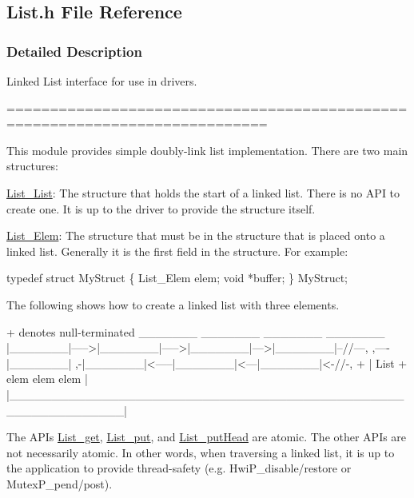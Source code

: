 \subsection{List.\+h File Reference}
\label{_list_8h}


\subsubsection{Detailed Description}
Linked List interface for use in drivers. 

============================================================================

This module provides simple doubly-\/link list implementation. There are two main structures\+:
\begin{DoxyItemize}
\item \hyperlink{struct_list___list}{List\+\_\+\+List}\+: The structure that holds the start of a linked list. There is no A\+P\+I to create one. It is up to the driver to provide the structure itself.
\item \hyperlink{struct_list___elem}{List\+\_\+\+Elem}\+: The structure that must be in the structure that is placed onto a linked list. Generally it is the first field in the structure. For example\+: 
\begin{DoxyCode}
\textcolor{keyword}{typedef} \textcolor{keyword}{struct }MyStruct \{
    List_Elem elem;
    \textcolor{keywordtype}{void} *buffer;
\} MyStruct;
\end{DoxyCode}

\end{DoxyItemize}

The following shows how to create a linked list with three elements.


\begin{DoxyCode}
+ denotes null-terminated
        \_\_\_\_\_\_\_        \_\_\_\_\_\_\_        \_\_\_\_\_\_\_      \_\_\_\_\_\_\_
       |\_\_\_\_\_\_\_|----->|\_\_\_\_\_\_\_|----->|\_\_\_\_\_\_\_|--->|\_\_\_\_\_\_\_|--\textcolor{comment}{//---,}
  ,----|\_\_\_\_\_\_\_|    ,-|\_\_\_\_\_\_\_|<-----|\_\_\_\_\_\_\_|<---|\_\_\_\_\_\_\_|<-\textcolor{comment}{//-, +}
  |      List       +   elem           elem          elem       |
  |\_\_\_\_\_\_\_\_\_\_\_\_\_\_\_\_\_\_\_\_\_\_\_\_\_\_\_\_\_\_\_\_\_\_\_\_\_\_\_\_\_\_\_\_\_\_\_\_\_\_\_\_\_\_\_\_\_\_\_\_\_|
\end{DoxyCode}


The A\+P\+Is \hyperlink{_list_8h_ac8c9babb4481314e3f0cce444f7fbade}{List\+\_\+get}, \hyperlink{_list_8h_a1608b5d7dc712fcf01dc5d837e22078a}{List\+\_\+put}, and \hyperlink{_list_8h_a1194d8eead79730c5da10e36b60f7044}{List\+\_\+put\+Head} are atomic. The other A\+P\+Is are not necessarily atomic. In other words, when traversing a linked list, it is up to the application to provide thread-\/safety (e.\+g. Hwi\+P\+\_\+disable/restore or Mutex\+P\+\_\+pend/post).

